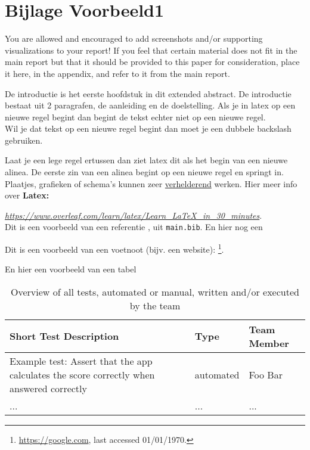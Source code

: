 \chapter{Bijlage Voorbeeld1}

You are allowed and encouraged to add screenshots and/or supporting visualizations to your report! If you feel that certain material does not fit in the main report but that it should be provided to this paper for consideration, place it here, in the appendix, and refer to it from the main report.

De introductie is het eerste hoofdstuk in dit extended abstract. De introductie bestaat uit 2 paragrafen, de aanleiding en de doelstelling.
Als je in latex op een nieuwe regel begint dan begint de tekst echter niet op een nieuwe regel.
\\
Wil je dat tekst op een nieuwe regel begint dan moet je een dubbele backslash gebruiken.

Laat je een lege regel ertussen dan ziet latex dit als het begin van een nieuwe alinea. De eerste zin van een alinea begint op een nieuwe regel en springt in.
Plaatjes, grafieken of schema’s kunnen zeer \underline{verhelderend} werken.
Hier meer info over \textbf{Latex:}

\emph{\url{https://www.overleaf.com/learn/latex/Learn_LaTeX_in_30_minutes}}.
\\

Dit is een voorbeeld van een referentie \cite{Pezze2008}, uit {\tt main.bib}.
En hier nog een \cite{russell2016artificial}

Dit is een voorbeeld van een voetnoot (bijv. een website): \footnote{\url{https://google.com}, last accessed 01/01/1970.}.

En hier een voorbeeld van een tabel
\begin{table}[H]
\centering
\caption{Overview of all tests, automated or manual, written and/or executed by the team}\label{tab:test-overview}
\begin{tabularx}{\textwidth}{Xll}
\toprule
Short Test Description & Type & Team Member \\ \midrule
Example test: Assert that the app calculates the score correctly when answered correctly & automated & Foo Bar \\
... & ... & ... \\
\bottomrule
\end{tabularx}
\end{table}
